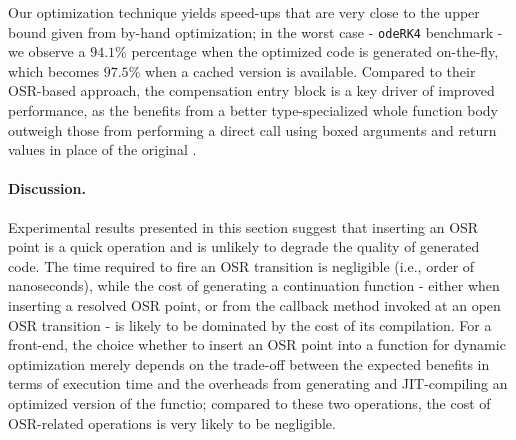 Our optimization technique yields speed-ups that are very close to the upper bound given from by-hand optimization; in the worst case - {\tt odeRK4} benchmark - we observe a $94.1\%$ percentage when the optimized code is generated on-the-fly, which becomes $97.5\%$ when a cached version is available. Compared to their OSR-based approach, the compensation entry block is a key driver of improved performance, as the benefits from a better type-specialized whole function body outweigh those from performing a direct call using boxed arguments and return values in place of the original \feval.

\paragraph{Discussion.}

Experimental results presented in this section suggest that inserting an OSR point is a quick operation and is unlikely to degrade the quality of generated code. The time required to fire an OSR transition is negligible (i.e., order of nanoseconds), while the cost of generating a continuation function - either when inserting a resolved OSR point, or from the callback method invoked at an open OSR transition - is likely to be dominated by the cost of its compilation. For a front-end, the choice whether to insert an OSR point into a function for dynamic optimization merely depends on the trade-off between the expected benefits in terms of execution time and the overheads from generating and JIT-compiling an optimized version of the functio; compared to these two operations, the cost of OSR-related operations is very likely to be negligible.